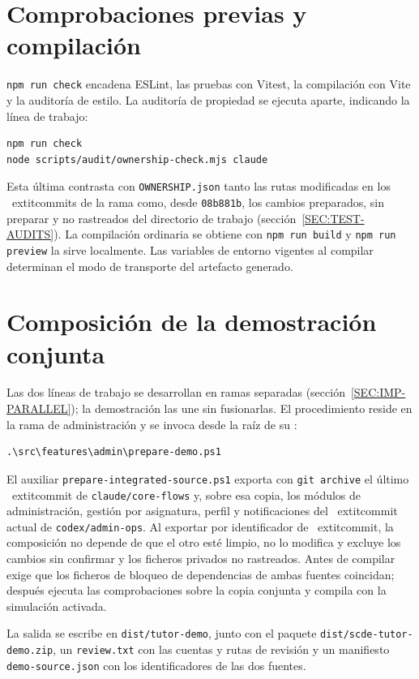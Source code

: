 \section*{Comprobaciones previas y compilación}
\texttt{npm run check} encadena ESLint, las pruebas con Vitest, la compilación
con Vite y la auditoría de estilo. La auditoría de propiedad se ejecuta aparte,
indicando la línea de trabajo:
\begin{verbatim}
npm run check
node scripts/audit/ownership-check.mjs claude
\end{verbatim}
Esta última contrasta con \texttt{OWNERSHIP.json} tanto las rutas modificadas
en los \	extit{commits} de la rama como, desde \texttt{08b881b}, los cambios
preparados, sin preparar y no rastreados del directorio de trabajo
(sección~\ref{SEC:TEST-AUDITS}). La compilación ordinaria se obtiene con
\texttt{npm run build} y \texttt{npm run preview} la sirve localmente. Las
variables de entorno vigentes al compilar determinan el modo de transporte del
artefacto generado.

\section*{Composición de la demostración conjunta}
Las dos líneas de trabajo se desarrollan en ramas separadas
(sección~\ref{SEC:IMP-PARALLEL}); la demostración las une sin fusionarlas. El
procedimiento reside en la rama de administración y se invoca desde la raíz de
su :
\begin{verbatim}
.\src\features\admin\prepare-demo.ps1
\end{verbatim}
El auxiliar \texttt{prepare-integrated-source.ps1} exporta con
\texttt{git archive} el último \	extit{commit} de \texttt{claude/core-flows} y, sobre
esa copia, los módulos de administración, gestión por asignatura, perfil y
notificaciones del \	extit{commit} actual de \texttt{codex/admin-ops}. Al exportar
por identificador de \	extit{commit}, la composición no depende de que el otro
 esté limpio, no lo modifica y excluye los cambios sin confirmar y
los ficheros privados no rastreados. Antes de compilar exige que los ficheros
de bloqueo de dependencias de ambas fuentes coincidan; después ejecuta las
comprobaciones sobre la copia conjunta y compila con la simulación activada.

La salida se escribe en \texttt{dist/tutor-demo}, junto con el paquete
\texttt{dist/scde-tutor-demo.zip}, un \texttt{review.txt} con las cuentas y rutas de
revisión y un manifiesto \texttt{demo-source.json} con los identificadores de
las dos fuentes.

